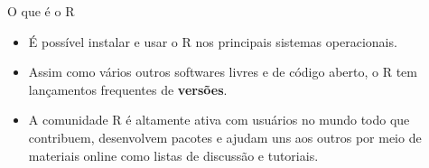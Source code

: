 \documentclass[
  ignorenonframetext,
  serif,
  professionalfont,
  usenames,
  dvipsnames,
  aspectratio = 169]{beamer}
\providecommand{\tightlist}{%
  \setlength{\itemsep}{0pt}\setlength{\parskip}{0pt}}
\renewcommand{\tightlist}{%
  \setlength{\itemsep}{0\baselineskip}
  \setlength{\parskip}{0.25\baselineskip}
}
\begin{document}
\begin{frame}{O que é o R}
\label{o-que-uxe9-o-r-1}
\begin{itemize}
\tightlist
\item
  É possível instalar e usar o R nos principais sistemas operacionais.
\end{itemize}

\vspace{0.3cm}

\begin{itemize}
\tightlist
\item
  Assim como vários outros softwares livres e de código aberto, o R tem
  lançamentos frequentes de \textbf{versões}.
\end{itemize}

\vspace{0.3cm}

\begin{itemize}
\tightlist
\item
  A comunidade R é altamente ativa com usuários no mundo todo que
  contribuem, desenvolvem pacotes e ajudam uns aos outros por meio de
  materiais online como listas de discussão e tutoriais.
\end{itemize}
\end{frame}
\end{document}
